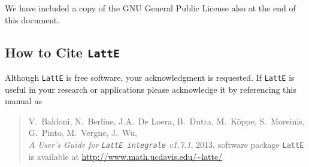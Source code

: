 \documentclass{article}
\newcommand{\latte}{{\tt LattE}\xspace}
\newcommand{\latteV}{v1.7.1}
\begin{document}
We have included a copy of the GNU General Public License also at the
end of this document.

\subsection{How to Cite {\tt LattE}}

Although {\tt LattE} is free software, your acknowledgment
is requested.  If {\tt LattE} is useful in your research or
applications please acknowledge it by referencing this manual as

\begin{quote}
  V.~Baldoni, N.~Berline, J.A.~De Loera, B.~Dutra, M.~K\"oppe, S.~Moreinis,
  G.~Pinto, M.~Vergne, J.~Wu,
  \\
  {\em A User's Guide for {\tt LattE integrale} \latteV}, 2013, software
  package \latte is available at \url{http://www.math.ucdavis.edu/~latte/}
\end{quote}
\end{document}
